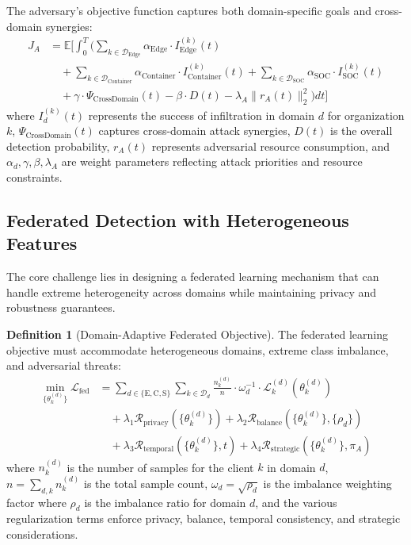 \documentclass[12pt,a4paper]{article}
\theoremstyle{definition}
\newtheorem{definition}[theorem]{Definition}
\newcommand{\E}{\mathbb{E}}
\newcommand{\D}{\mathcal{D}}
\begin{document}
The adversary's objective function captures both domain-specific goals and cross-domain synergies:
\begin{align}
J_A &= \E\Bigg[\int_0^T \Bigg(\sum_{k \in \D_{\text{Edge}}} \alpha_{\text{Edge}} \cdot I_{\text{Edge}}^{(k)}(t) \nonumber\\
&\quad + \sum_{k \in \D_{\text{Container}}} \alpha_{\text{Container}} \cdot I_{\text{Container}}^{(k)}(t) + \sum_{k \in \D_{\text{SOC}}} \alpha_{\text{SOC}} \cdot I_{\text{SOC}}^{(k)}(t) \nonumber \\
&\quad + \gamma \cdot \Psi_{\text{CrossDomain}}(t) - \beta \cdot D(t) - \lambda_A \|r_A(t)\|_2^2\Bigg) dt\Bigg]
\end{align}
where $I_d^{(k)}(t)$ represents the success of infiltration in domain $d$ for organization $k$, $\Psi_{\text{CrossDomain}}(t)$ captures cross-domain attack synergies, $D(t)$ is the overall detection probability, $r_A(t)$ represents adversarial resource consumption, and $\alpha_d, \gamma, \beta, \lambda_A$ are weight parameters reflecting attack priorities and resource constraints.

\subsection{Federated Detection with Heterogeneous Features}

The core challenge lies in designing a federated learning mechanism that can handle extreme heterogeneity across domains while maintaining privacy and robustness guarantees.

\begin{definition}[Domain-Adaptive Federated Objective]
\label{def:federated_objective}
The federated learning objective must accommodate heterogeneous domains, extreme class imbalance, and adversarial threats:
\begin{align}
\min_{\{\theta_k^{(d)}\}} \mathcal{L}_{\text{fed}} &= \sum_{d \in \{\text{E}, \text{C}, \text{S}\}} \sum_{k \in \D_d} \frac{n_k^{(d)}}{n} \cdot \omega_d^{-1} \cdot \mathcal{L}_k^{(d)}(\theta_k^{(d)}) \label{eq:federated_objective}\\
&\quad + \lambda_1 \mathcal{R}_{\text{privacy}}(\{\theta_k^{(d)}\}) + \lambda_2 \mathcal{R}_{\text{balance}}(\{\theta_k^{(d)}\}, \{\rho_d\}) \nonumber \\
&\quad + \lambda_3 \mathcal{R}_{\text{temporal}}(\{\theta_k^{(d)}\}, t) + \lambda_4 \mathcal{R}_{\text{strategic}}(\{\theta_k^{(d)}\}, \pi_A) \nonumber
\end{align}
where $n_k^{(d)}$ is the number of samples for the client $k$ in domain $d$, $n = \sum_{d,k} n_k^{(d)}$ is the total sample count, $\omega_d = \sqrt{\rho_d}$ is the imbalance weighting factor where $\rho_d$ is the imbalance ratio for domain $d$, and the various regularization terms enforce privacy, balance, temporal consistency, and strategic considerations.
\end{definition}
\end{document}
